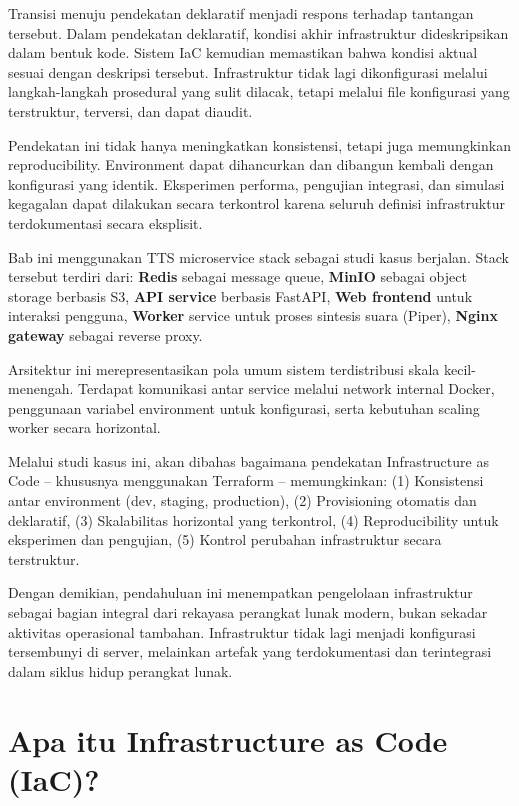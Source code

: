 Transisi menuju pendekatan deklaratif menjadi respons terhadap tantangan tersebut. Dalam pendekatan deklaratif, kondisi akhir infrastruktur dideskripsikan dalam bentuk kode. Sistem IaC kemudian memastikan bahwa kondisi aktual sesuai dengan deskripsi tersebut. Infrastruktur tidak lagi dikonfigurasi melalui langkah-langkah prosedural yang sulit dilacak, tetapi melalui file konfigurasi yang terstruktur, terversi, dan dapat diaudit.

Pendekatan ini tidak hanya meningkatkan konsistensi, tetapi juga memungkinkan reproducibility. Environment dapat dihancurkan dan dibangun kembali dengan konfigurasi yang identik. Eksperimen performa, pengujian integrasi, dan simulasi kegagalan dapat dilakukan secara terkontrol karena seluruh definisi infrastruktur terdokumentasi secara eksplisit.

Bab ini menggunakan TTS microservice stack sebagai studi kasus berjalan. Stack tersebut terdiri dari:
\textbf{Redis} sebagai message queue,  
\textbf{MinIO} sebagai object storage berbasis S3,  
\textbf{API service} berbasis FastAPI,  
\textbf{Web frontend} untuk interaksi pengguna,  
\textbf{Worker} service untuk proses sintesis suara (Piper),  
\textbf{Nginx gateway} sebagai reverse proxy.  

Arsitektur ini merepresentasikan pola umum sistem terdistribusi skala kecil-menengah. Terdapat komunikasi antar service melalui network internal Docker, penggunaan variabel environment untuk konfigurasi, serta kebutuhan scaling worker secara horizontal.

Melalui studi kasus ini, akan dibahas bagaimana pendekatan Infrastructure as Code -- khususnya menggunakan Terraform -- memungkinkan:
(1) Konsistensi antar environment (dev, staging, production),  
(2) Provisioning otomatis dan deklaratif,  
(3) Skalabilitas horizontal yang terkontrol,  
(4) Reproducibility untuk eksperimen dan pengujian,  
(5) Kontrol perubahan infrastruktur secara terstruktur.  

Dengan demikian, pendahuluan ini menempatkan pengelolaan infrastruktur sebagai bagian integral dari rekayasa perangkat lunak modern, bukan sekadar aktivitas operasional tambahan. Infrastruktur tidak lagi menjadi konfigurasi tersembunyi di server, melainkan artefak yang terdokumentasi dan terintegrasi dalam siklus hidup perangkat lunak.


\section{Apa itu Infrastructure as Code (IaC)?}

